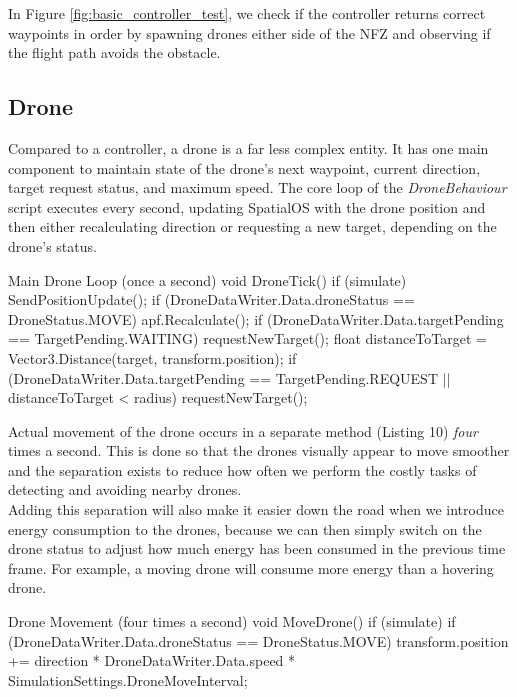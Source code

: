 \documentclass[a4paper,12pt,titlepage]{article}
\begin{document}
In Figure \ref{fig:basic_controller_test}, we check if the controller returns correct waypoints in order by spawning drones either side of the NFZ and observing if the flight path avoids the obstacle.

\subsection{Drone}
Compared to a controller, a drone is a far less complex entity. It has one main component to maintain state of the drone's next waypoint, current direction, target request status, and maximum speed. The core loop of the \textit{DroneBehaviour} script executes every second, updating SpatialOS with the drone position and then either recalculating direction or requesting a new target, depending on the drone's status.

\begin{sexylisting}[colback=white]{Main Drone Loop (once a second)}
void DroneTick()
{
  if (simulate)
  {
    SendPositionUpdate();
    if (DroneDataWriter.Data.droneStatus == DroneStatus.MOVE)
    {
      apf.Recalculate();
    }
    if (DroneDataWriter.Data.targetPending == TargetPending.WAITING)
    {
      requestNewTarget();
    }
    float distanceToTarget = Vector3.Distance(target, transform.position);
    if (DroneDataWriter.Data.targetPending == TargetPending.REQUEST
      || distanceToTarget < radius)
    {
      requestNewTarget();
    }
  }
}
\end{sexylisting}

Actual movement of the drone occurs in a separate method (Listing 10) \textit{four} times a second. This is done so that the drones visually appear to move smoother and the separation exists to reduce how often we perform the costly tasks of detecting and avoiding nearby drones.\\

Adding this separation will also make it easier down the road when we introduce energy consumption to the drones, because we can then simply switch on the drone status to adjust how much energy has been consumed in the previous time frame. For example, a moving drone will consume more energy than a hovering drone.

\begin{sexylisting}[colback=white]{Drone Movement (four times a second)}
void MoveDrone()
{
  if (simulate)
  {
    if (DroneDataWriter.Data.droneStatus == DroneStatus.MOVE)
    {
      transform.position += direction * DroneDataWriter.Data.speed
        * SimulationSettings.DroneMoveInterval;
    }
  }
}
\end{sexylisting}
\end{document}
